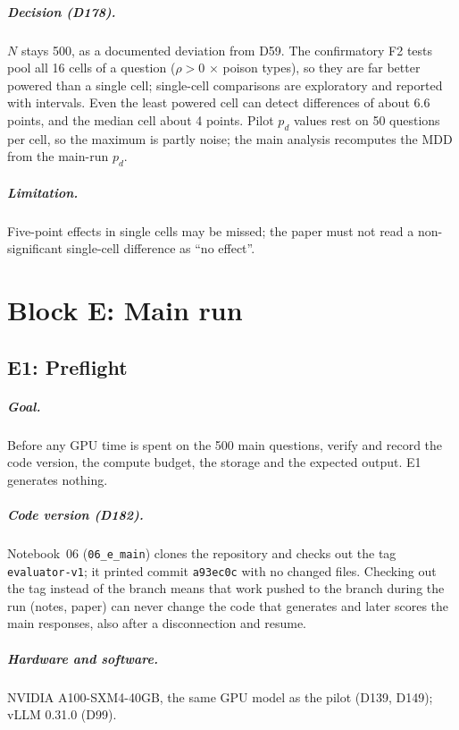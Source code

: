 \documentclass[11pt,a4paper]{report}
\begin{document}
\paragraph{Decision (D178).} $N$ stays 500, as a documented deviation from
D59. The confirmatory F2 tests pool all 16 cells of a question ($\rho>0$
$\times$ poison types), so they are far better powered than a single cell;
single-cell comparisons are exploratory and reported with intervals. Even the
least powered cell can detect differences of about 6.6 points, and the median
cell about 4 points. Pilot $p_d$ values rest on 50 questions per cell, so the
maximum is partly noise; the main analysis recomputes the MDD from the main-run
$p_d$.

\paragraph{Limitation.} Five-point effects in single cells may be missed; the
paper must not read a non-significant single-cell difference as ``no effect''.

\chapter{Block E: Main run}
\label{ch:blocke}

\section{E1: Preflight}

\paragraph{Goal.} Before any GPU time is spent on the 500 main questions,
verify and record the code version, the compute budget, the storage and the
expected output. E1 generates nothing.

\paragraph{Code version (D182).} Notebook~06 (\texttt{06\_e\_main}) clones the
repository and checks out the tag \texttt{evaluator-v1}; it printed commit
\texttt{a93ec0c} with no changed files. Checking out the tag instead of the
branch means that work pushed to the branch during the run (notes, paper)
can never change the code that generates and later scores the main
responses, also after a disconnection and resume.

\paragraph{Hardware and software.} NVIDIA A100-SXM4-40GB, the same GPU model
as the pilot (D139, D149); vLLM 0.31.0 (D99).
\end{document}
